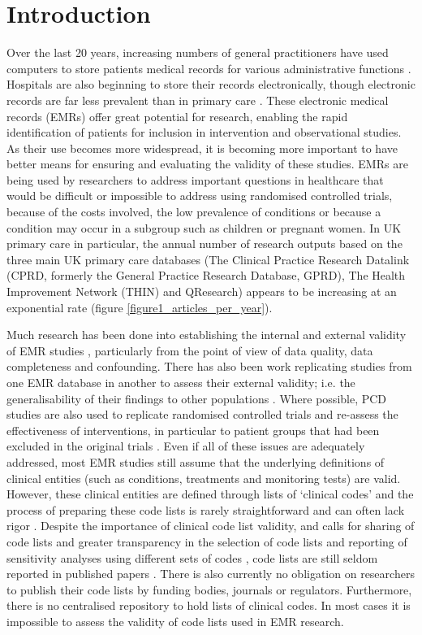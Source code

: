 \documentclass[10pt]{article}
\begin{document}
\section*{Introduction}

Over the last 20 years, increasing numbers of general practitioners have used computers to store patients medical records for various administrative functions \cite{Purves1996}. Hospitals are also beginning to store their records electronically, though electronic records are far less prevalent than in primary care \cite{Ashish2009}. These electronic medical records (EMRs) offer great potential for research, enabling the rapid identification of patients for inclusion in intervention and observational studies. As their use becomes more widespread, it is becoming more important to have better means for ensuring and evaluating the validity of these studies. EMRs are being used by researchers to address important questions in healthcare that would be difficult or impossible to address using randomised controlled trials, because of the costs involved, the low prevalence of conditions or because a condition may occur in a subgroup such as children or pregnant women. In UK primary care in particular, the annual number of research outputs based on the three main UK primary care databases (The Clinical Practice Research Datalink (CPRD, formerly the General Practice Research Database, GPRD), The Health Improvement Network (THIN) and QResearch) appears to be increasing at an exponential rate (figure \ref{figure1_articles_per_year}). 


Much research has been done into establishing the internal and external validity of EMR studies \cite{Herrett2010}, particularly from the point of view of data quality, data completeness and confounding.  There has also been work replicating studies from one EMR database in another to assess their external validity; i.e. the generalisability of their findings to other populations \cite{Hippisley-Cox2008, Vinogradova2013, Reeves2014}.  Where possible, PCD studies are also used to replicate randomised controlled trials and re-assess the effectiveness of interventions, in particular to patient groups that had been excluded in the original trials \cite{Tannen2008, Tannen2009}. Even if all of these issues are adequately addressed, most EMR studies still assume that the underlying definitions of clinical entities (such as conditions, treatments and monitoring tests) are valid.  However, these clinical entities are defined through lists of `clinical codes' and the process of preparing these code lists is rarely straightforward and can often lack rigor \cite{Dave2009}.  Despite the importance of clinical code list validity, and calls for sharing of code lists and greater transparency in the selection of code lists and reporting of sensitivity analyses using different sets of codes \cite{Gulliford2009, Bhattarai2012}, code lists are still seldom reported in published papers \cite{Herrett2010}.  There is also currently no obligation on researchers to publish their code lists by funding bodies, journals or regulators.  Furthermore, there is no centralised repository to hold lists of clinical codes. In most cases it is impossible to assess the validity of code lists used in EMR research. 
\end{document}
